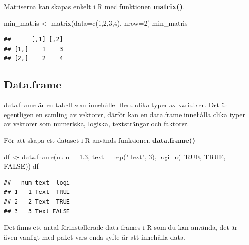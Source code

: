 \documentclass[
]{book}
\newenvironment{Shaded}{\begin{snugshade}}{\end{snugshade}}
\newcommand{\AttributeTok}[1]{\textcolor[rgb]{0.77,0.63,0.00}{#1}}
\newcommand{\ConstantTok}[1]{\textcolor[rgb]{0.00,0.00,0.00}{#1}}
\newcommand{\DecValTok}[1]{\textcolor[rgb]{0.00,0.00,0.81}{#1}}
\newcommand{\FunctionTok}[1]{\textcolor[rgb]{0.00,0.00,0.00}{#1}}
\newcommand{\NormalTok}[1]{#1}
\newcommand{\OtherTok}[1]{\textcolor[rgb]{0.56,0.35,0.01}{#1}}
\newcommand{\SpecialCharTok}[1]{\textcolor[rgb]{0.00,0.00,0.00}{#1}}
\newcommand{\StringTok}[1]{\textcolor[rgb]{0.31,0.60,0.02}{#1}}
\begin{document}
Matriserna kan skapas enkelt i R med funktionen \textbf{matrix()}.

\begin{Shaded}
\begin{Highlighting}[]
\NormalTok{min\_matris }\OtherTok{\textless{}{-}} \FunctionTok{matrix}\NormalTok{(}\AttributeTok{data=}\FunctionTok{c}\NormalTok{(}\DecValTok{1}\NormalTok{,}\DecValTok{2}\NormalTok{,}\DecValTok{3}\NormalTok{,}\DecValTok{4}\NormalTok{), }\AttributeTok{nrow=}\DecValTok{2}\NormalTok{)}
\NormalTok{min\_matris}
\end{Highlighting}
\end{Shaded}

\begin{verbatim}
##      [,1] [,2]
## [1,]    1    3
## [2,]    2    4
\end{verbatim}

\hypertarget{data.frame}{%
\subsection{Data.frame}\label{data.frame}}

data.frame är en tabell som innehåller flera olika typer av variabler. Det är egentligen en samling av vektorer, därför kan en data.frame innehålla olika typer av vektorer som numeriska, logiska, textsträngar och faktorer.

För att skapa ett dataset i R används funktionen \textbf{data.frame()}

\begin{Shaded}
\begin{Highlighting}[]
\NormalTok{df }\OtherTok{\textless{}{-}} \FunctionTok{data.frame}\NormalTok{(}\AttributeTok{num =} \DecValTok{1}\SpecialCharTok{:}\DecValTok{3}\NormalTok{, }\AttributeTok{text =} \FunctionTok{rep}\NormalTok{(}\StringTok{"Text"}\NormalTok{, }\DecValTok{3}\NormalTok{), }\AttributeTok{logi=}\FunctionTok{c}\NormalTok{(}\ConstantTok{TRUE}\NormalTok{, }\ConstantTok{TRUE}\NormalTok{, }\ConstantTok{FALSE}\NormalTok{)) }
\NormalTok{df }
\end{Highlighting}
\end{Shaded}

\begin{verbatim}
##   num text  logi
## 1   1 Text  TRUE
## 2   2 Text  TRUE
## 3   3 Text FALSE
\end{verbatim}

Det finns ett antal förinstallerade data frames i R som du kan använda, det är även vanligt med paket vars enda syfte är att innehålla data.
\end{document}
